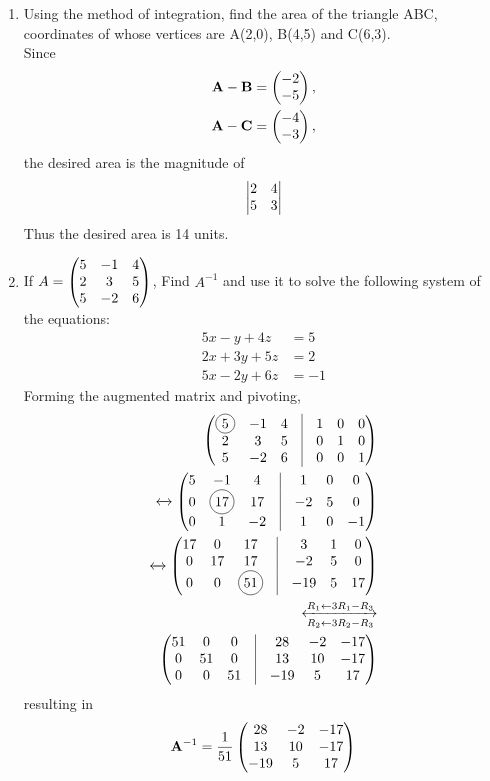 \documentclass[journal,12pt,twocolumn]{IEEEtran}
\renewcommand\thesection{\arabic{section}}
\begin{document}
\begin{enumerate}[label=\thesection.\arabic*.,ref=\thesection.\theenumi]
\item Using the method of integration, find the area of the triangle ABC, coordinates of whose vertices are A(2,0), B(4,5) and C(6,3).\\
    \solution Since 
\begin{align}
	\mathbf{A}-\mathbf{B} &= \begin{pmatrix}-2 \\-5\end{pmatrix},
	\\
	\mathbf{A}-\mathbf{C} &= \begin{pmatrix}-4 \\-3\end{pmatrix},
    \end{align}
    the desired area is  the magnitude of 
\begin{align}
 \begin{vmatrix}2 & 4\\5 & 3\end{vmatrix} 
    \end{align}
    Thus the desired area is 14 units.
\item If $A=\begin{pmatrix}5 & -1 & 4 \\ 2 & 3 & 5 \\ 5 & -2 & 6\end{pmatrix} $, Find $A^{-1}$ and use it to solve the following system of the equations: \\
\begin{align}
	5x-y+4z &= 5 \nonumber \\
	2x+3y+5z &= 2 \nonumber \\
	5x-2y+6z &= -1 
\nonumber
\end{align}
   \solution Forming the augmented matrix and pivoting,  
\begin{align}
	\myvec{\circled{5} & -1 & 4 & \vrule & 1 & 0 & 0\\ 2 & 3 & 5 & \vrule & 0 & 1 & 0\\ 5 & -2 & 6 & \vrule & 0 & 0 & 1}
	\\
	\xleftrightarrow []{}
	\myvec{5 & -1 & 4 & \vrule & 1 & 0 & 0\\ 0 & \circled{17} & 17 & \vrule & -2 & 5 & 0\\ 0 & 1 & -2 & \vrule & 1 & 0 & -1}
	\\
	\xleftrightarrow []{}
	\myvec{17 & 0 & 17 & \vrule & 3 & 1 & 0\\ 0 & 17 & 17 & \vrule & -2 & 5 & 0\\ 0 & 0 & \circled{51} & \vrule & -19 & 5 & 17}
	\\
	\xleftrightarrow [R_2\leftarrow 3R_2 - R_3]{R_1\leftarrow 3R_1 - R_3}
	\\
	\myvec{51 & 0 & 0 & \vrule & 28 & -2& -17\\ 0 & 51 & 0 & \vrule & 13 & 10 & -17\\ 0 & 0 & 51 & \vrule & -19 & 5 & 17}
    \end{align}
    resulting in 
\begin{align}
	\mathbf{A}^{-1} = \frac{1}{51}\begin{pmatrix} 28 & -2 & -17\\  13 & 10 & -17\\  -19 & 5 & 17\end{pmatrix}
    \end{align}
    

\end{enumerate}
\end{document}
